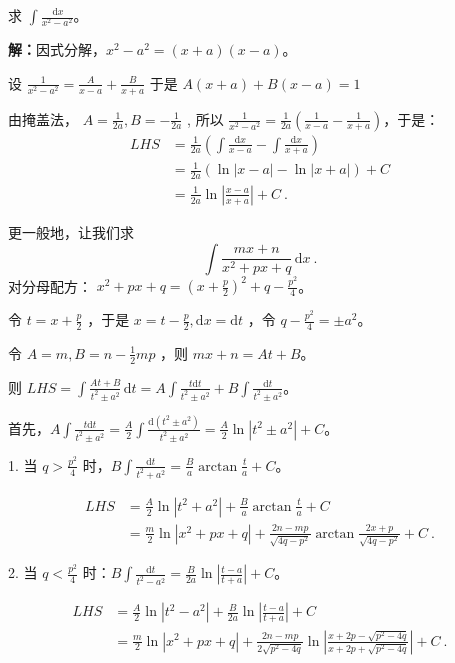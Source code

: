 \begin{example}{}
求 $\displaystyle{\int \frac{\,\mathrm{d}x}{x^2-a^2}}$。

\textbf{解：}因式分解，\(x^2-a^2=(x+a)(x-a)\)。

设 $\displaystyle{\frac{1}{x^2-a^2}=\frac{A}{x-a}+\frac{B}{x+a}}$ 于是 \(A(x+a)+B(x-a)=1\)

由掩盖法， $\displaystyle{A=\frac{1}{2a},B=-\frac{1}{2a}}$ , 所以 $\displaystyle{\frac{1}{x^2-a^2}=\frac{1}{2a}\left(\frac{1}{x-a}-\frac{1}{x+a} \right)}$，于是：
\begin{equation}\begin{aligned}
LHS&=\frac{1}{2a}\left(\int\frac{\mathrm{d}x}{x-a}-\int\frac{\mathrm{d}x}{x+a}\right)\\&=\frac{1}{2a}\left(\ln|x-a|-\ln|x+a|\right)+C \\&=\frac{1}{2a}\ln\left|\frac{x-a}{x+a}\right|+C~.
\end{aligned}\end{equation}

更一般地，让我们求
$$
\int\frac{mx+n}{x^2+px+q}\,\mathrm{d}x~.
$$
对分母配方： $\displaystyle{x^2+px+q=\left(x+\frac{p}{2}\right)^2+q-\frac{p^2}{4}}$。

令 $\displaystyle{t=x+\frac{p}{2}}$ ，于是 $\displaystyle{x=t-\frac{p}{2},\mathrm{d}x=\mathrm {d}t}$ ，令 $\displaystyle{q-\frac{p^2}{4}=\pm a^2}$。

令 $\displaystyle{A=m,B=n-\frac{1}{2}mp}$ ，则 \(mx+n=At+B\)。

则 $\displaystyle{LHS=\int\frac{At+B}{t^2\pm a^2}\,\mathrm{d}t =A\int\frac{t\mathrm{d}t}{t^2\pm a^2}+B\int\frac{\mathrm{d}t}{t^2\pm a^2}}$。

首先，$\displaystyle{A\int\frac{t\mathrm{d}t}{t^2\pm a^2}=\frac{A}{2}\int\frac{\mathrm{d}\left(t^2\pm a^2\right)}{t^2\pm a^2}=\frac{A}{2}\ln\left|t^2\pm a^2\right|+C}$。

1. 当 $\displaystyle{q>\frac{p^2}{4}}$ 时，$\displaystyle{B\int\frac{\mathrm{d}t}{t^2+ a^2}=\frac{B}{a}\arctan{\frac{t}{a}}+C}$。

\begin{equation}\begin{aligned}
LHS&=\frac{A}{2}\ln\left|t^2+ a^2\right|+\frac{B}{a}\arctan{\frac{t}{a}}+C \\&=\frac{m}{2}\ln\left|x^2+px+q\right|+\frac{2n-mp}{\sqrt{4q-p^2}}\arctan{\frac{2x+p}{\sqrt{4q-p^2}}}+C~.
\end{aligned}\end{equation}

2. 当 $\displaystyle{q<\frac{p^2}{4}}$ 时：$\displaystyle{B\int\frac{\mathrm{d}t}{t^2- a^2}=\frac{B}{2a}\ln\left|\frac{t-a}{t+a}\right|+C}$。

\begin{equation}
\begin{aligned}
LHS&=\frac{A}{2}\ln\left|t^2- a^2\right|+\frac{B}{2a}\ln\left|\frac{t-a}{t+a}\right|+C \\&=\frac{m}{2}\ln\left|x^2+px+q\right|+\frac{2n-mp}{2\sqrt{p^2-4q}}\ln\left|\frac{x+2p-\sqrt{p^2-4q}}{x+2p+\sqrt{p^2-4q}}\right|+C~.
\end{aligned}
\end{equation}
\end{example}

